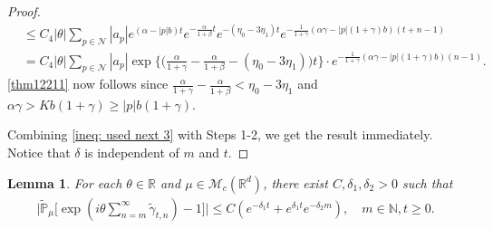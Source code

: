 \documentclass[12pt,a4paper]{amsart}
\theoremstyle{plain}
\newtheorem{lem}[thm]{Lemma}
\theoremstyle{definition}
\numberwithin{equation}{section}
\begin{document}
\begin{proof}
\begin{align}
    & \leq C_4 | \theta | \sum_{ p \in \mathcal{N} } | a_p | e^{ ( \alpha - |p| b ) t} e^{ - \frac{ \alpha } { 1 + \beta } t } e^{ - ( \eta_0 - 3 \eta_1 )t  } e^{ - \frac{ 1 } { 1 + \gamma } ( \alpha \gamma - | p |(1+\gamma)b)(t+n-1)}\\
    & = C_4 | \theta | \sum_{ p \in \mathcal{ N } } | a_p | \exp \Big \{ \Big( \frac { \alpha } { 1 + \gamma } - \frac{ \alpha } { 1 + \beta } - ( \eta_0 - 3 \eta_1 ) \Big) t \Big \} \cdot e^{ - \frac { 1 } { 1 + \gamma }( \alpha \gamma - | p | ( 1 + \gamma ) b ) ( n - 1 ) }.
  \end{align}
  \eqref{thm12211} now follows  since $\frac{\alpha}{1+\gamma}-\frac{\alpha}{1+\beta}<\eta_0-3\eta_1$ and $\alpha\gamma>Kb(1+\gamma)\geq |p|b(1+\gamma)$.

  Combining \eqref{ineq: used next 3} with Steps 1-2, we get the result immediately. Notice that $\delta$ is independent of $m$ and $t$.
\end{proof}
\begin{lem}
  \label{lem: lemma05}
  For each $\theta\in \mathbb{R}$ and $\mu \in \mathcal{M}_c(\mathbb{R}^d)$, there exist  $C,\delta_1,\delta_2>0$ such that
  \begin{align}
    \Big|\widetilde{\mathbb{P}}_{\mu}\Big[\exp(i\theta \sum_{n=m}^{\infty}\widetilde{\gamma}_{t,n})-1\Big]\Big|
    \leq C(e^{-\delta_1 t}+e^{\delta_1 t}e^{-\delta_2 m}),
    \quad m\in \mathbb{N}, t\geq 0.
  \end{align}
\end{lem}
\end{document}
